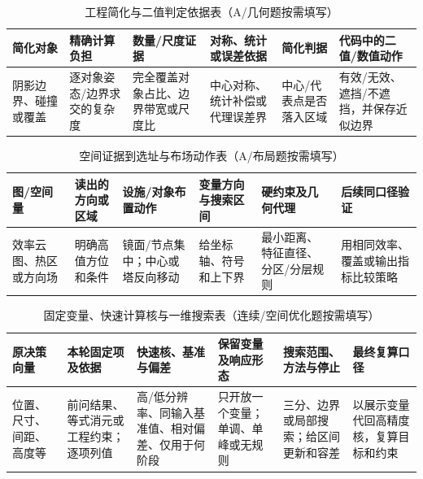 \documentclass[withoutpreface,bwprint]{cumcmthesis}
\begin{document}
  \begin{table}[H]
    \centering
    \small
    \caption{工程简化与二值判定依据表（A/几何题按需填写）}
    \label{tab:engineering-simplification-guide}
    \begin{tabular}{p{1.75cm}p{2.25cm}p{2.1cm}p{2.35cm}p{2.2cm}p{2.15cm}}
      \toprule
      简化对象 & 精确计算负担 & 数量/尺度证据 & 对称、统计或误差依据 & 简化判据 & 代码中的二值/数值动作 \\
      \midrule
      阴影边界、碰撞或覆盖 & 逐对象姿态/边界求交的复杂度 & 完全覆盖对象占比、边界带宽或尺度比 & 中心对称、统计补偿或代理误差界 & 中心/代表点是否落入区域 & 有效/无效、遮挡/不遮挡，并保存近似边界 \\
      \bottomrule
    \end{tabular}
  \end{table}
  \begin{table}[H]
    \centering
    \small
    \caption{空间证据到选址与布场动作表（A/布局题按需填写）}
    \label{tab:spatial-evidence-layout-guide}
    \begin{tabular}{p{1.55cm}p{2.25cm}p{2.15cm}p{2.35cm}p{2.25cm}p{2.25cm}}
      \toprule
      图/空间量 & 读出的方向或区域 & 设施/对象布置动作 & 变量方向与搜索区间 & 硬约束及几何代理 & 后续同口径验证 \\
      \midrule
      效率云图、热区或方向场 & 明确高值方位和条件 & 镜面/节点集中；中心或塔反向移动 & 给坐标轴、符号和上下界 & 最小距离、特征直径、分区/分层规则 & 用相同效率、覆盖或输出指标比较策略 \\
      \bottomrule
    \end{tabular}
  \end{table}
  \begin{table}[H]
    \centering
    \small
    \setlength{\tabcolsep}{3.5pt}
    \caption{固定变量、快速计算核与一维搜索表（连续/空间优化题按需填写）}
    \label{tab:fixed-fast-kernel-search-guide}
    \begin{tabular}{p{2.0cm}p{2.35cm}p{2.45cm}p{2.35cm}p{2.35cm}p{2.1cm}}
      \toprule
      原决策向量 & 本轮固定项及依据 & 快速核、基准与偏差 & 保留变量及响应形态 & 搜索范围、方法与停止 & 最终复算口径 \\
      \midrule
      位置、尺寸、间距、高度等 & 前问结果、等式消元或工程约束；逐项列值 & 高/低分辨率、同输入基准值、相对偏差、仅用于何阶段 & 只开放一个变量；单调、单峰或无规则 & 三分、边界或局部搜索；给区间更新和容差 & 以展示变量代回高精度核，复算目标和约束 \\
      \bottomrule
    \end{tabular}
  \end{table}
\end{document}
